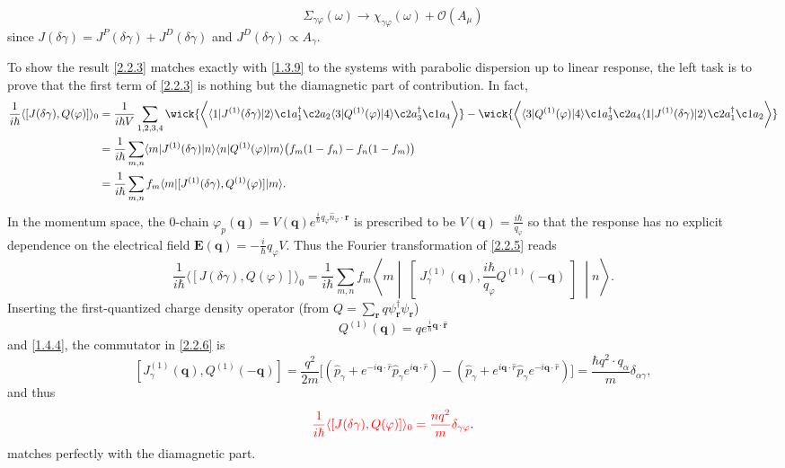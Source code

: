 \documentclass[10pt,nofootinbib,letterpaper]{revtex4}
\begin{document}
		\begin{equation*}
			\Sigma_{\gamma\varphi}(\omega)\rightarrow \chi_{\gamma\varphi}(\omega)+\mathcal{O}(A_\mu)
		\end{equation*}
		since $J(\delta\gamma)=J^P(\delta\gamma)+J^D(\delta\gamma)$ and $J^D(\delta\gamma)\propto A_\gamma$.\par
		To show the result \eqref{2.2.3} matches exactly with \eqref{1.3.9} to the systems with parabolic dispersion up to linear response, the left task is to prove that the first term of \eqref{2.2.3} is nothing but the diamagnetic part of contribution. In fact,
		\begin{align}
			\dfrac{1}{i\hbar}\langle[J(\delta\gamma),Q(\varphi)]\rangle_0&=\dfrac{1}{i\hbar V}\sum_{1,2,3,4}\wick{\bigg\langle\langle1|J^{(1)}(\delta\gamma)|2\rangle \c1 a_1^\dagger \c2 a_2\langle 3|Q^{(1)}(\varphi)|4\rangle \c2 a_3^\dagger \c1 a_4\bigg\rangle}-\wick{\bigg\langle\langle3|Q^{(1)}(\varphi)|4\rangle \c1 a_3^\dagger \c2 a_4\langle 1|J^{(1)}(\delta\gamma)|2\rangle\c2 a_1^\dagger \c1 a_2\bigg\rangle}\nonumber\\
			&=\dfrac{1}{i\hbar}\sum_{m,n}\langle m|J^{(1)}(\delta\gamma)|n\rangle\langle n|Q^{(1)}(\varphi)|m\rangle\big(f_m(1-f_n)-f_n(1-f_m)\big)\nonumber\\
			&=\dfrac{1}{i\hbar}\sum_{m,n}f_m\langle m|[J^{(1)}(\delta\gamma),Q^{(1)}(\varphi)]|m\rangle.\label{2.2.5}
		\end{align}
		In the momentum space, the $0$-chain $\varphi_p(\bm{q})=V(\bm{q})e^{\frac i\hbar q_\varphi\hat n_\varphi\cdot\bm{r}}$ is prescribed to be $V(\bm{q})=\frac{i\hbar}{q_\varphi}$ so that the response has no explicit dependence on the electrical field $\bm{E}(\bm{q})=-\frac i\hbar q_\varphi V$. Thus the Fourier transformation of \eqref{2.2.5} reads
		\begin{equation}\label{2.2.6}
			\dfrac{1}{i\hbar}\langle[J(\delta\gamma),Q(\varphi)]\rangle_0=\dfrac{1}{i\hbar}\sum_{m,n}f_m\left\langle m\middle|\middle[J^{(1)}_\gamma(\bm{q}),\dfrac{i\hbar}{q_\varphi}Q^{(1)}(-\bm{q})\middle]\middle|n\right\rangle.
		\end{equation}
		Inserting the first-quantized charge density operator (from $Q=\sum_{\bm{r}}q\psi_{\bm{r}}^\dagger\psi_{\bm{r}}$)
		\begin{equation}\label{2.2.5}
			Q^{(1)}(\bm{q})=q e^{\frac i\hbar\bm{q}\cdot\hat{\bm{r}}}
		\end{equation}
		and \eqref{1.4.4}, the commutator in \eqref{2.2.6} is
		\begin{equation}\label{2.2.6}
			[J^{(1)}_\gamma(\bm{q}),Q^{(1)}(-\bm{q})]=\dfrac{q^2}{2m}\bigg[(\hat{p}_\gamma+e^{-i\bm{q}\cdot\hat{r}}\hat p_\gamma e^{i\bm{q}\cdot\hat{r}})-(\hat{p}_\gamma+e^{i\bm{q}\cdot\hat{r}}\hat p_\gamma e^{-i\bm{q}\cdot\hat{r}})\bigg]=\dfrac{\hbar q^2\cdot q_\alpha}{m}\delta_{\alpha\gamma},
		\end{equation}
		and thus
		\begin{equation}\label{2.2.7}
			{\color{red}\dfrac{1}{i\hbar}\langle[J(\delta\gamma),Q(\varphi)]\rangle_0=\dfrac{nq^2}{m}\delta_{\gamma\varphi}}.
		\end{equation}
		matches perfectly with the diamagnetic part.
\end{document}

